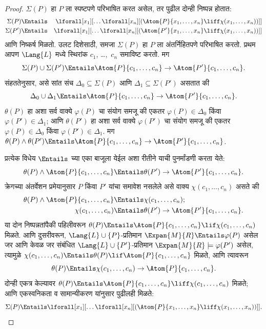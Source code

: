 \begin{proof}
$\Sigma(P)$ हा $P$ ला स्पष्टपणे परिभाषित करत असेल, तर पुढील दोन्ही निष्पन्न होतात:
\begin{align*}
  \Sigma(P) & \Entails & \lforall[x_1][\dots \lforall[x_n]
    [(\Atom{P}{x_1,\dots, x_n} \liff \chi(x_1,\dots,x_n))]]\\
  \Sigma(P') & \Entails & \lforall[x_1][\dots \lforall[x_n]
    [(\Atom{P'}{x_1,\dots, x_n} \liff \chi(x_1,\dots,x_n))]]
\end{align*}
आणि निष्कर्ष मिळतो. उलट दिशेसाठी, समजा $\Sigma(P)$ हा $P$ ला
अंतर्निहितपणे परिभाषित करतो. प्रथम आपण $\Lang{L}$ मध्ये स्थिरांक
$c_1$, \dots,~$c_n$ समाविष्ट करतो. मग
\[\Sigma(P) \cup \Sigma(P') \Entails
\Atom{P}{c_1, \dots, c_n} \to  \Atom{P'}{c_1, \dots, c_n}.
\]
संहततेनुसार, असे सांत संच $\Delta_0 \subseteq \Sigma(P)$ आणि
$\Delta_1 \subseteq \Sigma(P')$ असतात की
\[\Delta_0 \cup \Delta_1 \Entails
\Atom{P}{c_1, \dots, c_n} \to \Atom{P'}{c_1, \dots, c_n}.
\]
$\theta(P)$ हा अशा सर्व वाक्ये $\varphi(P)$ चा संयोग समजू की एकतर
$\varphi(P) \in \Delta_0$ किंवा $\varphi(P') \in \Delta_1$; आणि $\theta(P')$ हा अशा
सर्व वाक्ये $\varphi(P')$ चा संयोग समजू की एकतर $\varphi(P) \in \Delta_0$
किंवा $\varphi(P') \in \Delta_1$. मग $\theta(P) \land
\theta(P') \Entails \Atom{P}{c_1, \dots, c_n} \to \Atom{P'}{c_1, \dots, c_n}$.

प्रत्येक विधेय $\Entails$ च्या एका बाजूला येईल अशा रीतीने याची
पुनर्मांडणी करता येते:
\[\theta(P) \land \Atom{P}{c_1, \dots, c_n} \Entails
\theta(P') \to \Atom{P'}{c_1, \dots, c_n}.
\]
क्रेगच्या अंतर्वेशन प्रमेयानुसार $P$ किंवा $P'$ यांचा समावेश नसलेले असे
वाक्य $\chi(c_1,\dots, c_n)$ असते की
\begin{align*}
  \theta(P) \land \Atom{P}{c_1, \dots, c_n} & \Entails \chi(c_1,\dots, c_n); \\
  \chi(c_1,\dots, c_n) & \Entails \theta(P') \to \Atom{P'}{c_1, \dots, c_n}.
\end{align*}
या दोन निष्पन्नतांपैकी पहिलीवरून $\theta(P) \Entails
\Atom{P}{c_1,\dots, c_n} \lif \chi(c_1,\dots, c_n)$ मिळते. आणि दुसरीवरून,
$\Lang{L} \cup \{P\}$-प्रतिमान $\Expan{M}{R} \Entails \varphi(P)$ असेल जर
आणि केवळ जर संबंधित $\Lang{L} \cup \{P'\}$-प्रतिमान
$\Expan{M}{R} \models \varphi(P')$ असेल, त्यामुळे
$\chi(c_1,\dots, c_n) \Entails \theta(P) \lif \Atom{P}{c_1,\dots, c_n}$ मिळते,
आणि त्यावरून
\[\theta(P) \Entails \chi(c_1,\dots,c_n) \to \Atom{P}{c_1,\dots, c_n}.
\]
दोन्ही एकत्र केल्यावर $\theta(P) \Entails \Atom{P}{c_1,\dots, c_n}
\liff \chi(c_1, \dots, c_n)$ मिळते; आणि एकस्वनिकता व सामान्यीकरण यांनुसार पुढीलही मिळते:
\[\Sigma(P) \Entails
\lforall[x_1][\dots\lforall[x_n][(\Atom{P}{x_1,\dots, x_n} \liff
    \chi(x_1,\dots, x_n))]].
\]
\end{proof}



